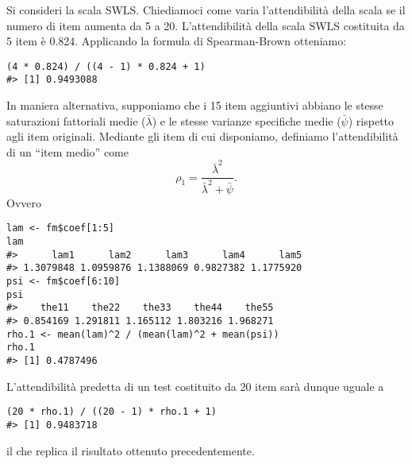 \begin{exmp}
Si consideri la scala SWLS. Chiediamoci come varia l'attendibilità della scala se il numero di item aumenta da 5 a 20. L'attendibilità della scala SWLS costituita da 5 item è 0.824. Applicando la formula di Spearman-Brown otteniamo:

\begin{lstlisting}
(4 * 0.824) / ((4 - 1) * 0.824 + 1)
#> [1] 0.9493088
\end{lstlisting}
\end{exmp}

\begin{exmp}
In maniera alternativa, supponiamo che i 15 item aggiuntivi abbiano le stesse saturazioni fattoriali medie ($\bar{\lambda}$) e le stesse varianze specifiche medie ($\bar{\psi}$) rispetto agli item originali.
Mediante gli item di cui disponiamo, definiamo l'attendibilità di un ``item medio'' come
\begin{equation}
\rho_1 = \frac{\bar{\lambda}^2}{\bar{\lambda}^2 + \bar{\psi}}.
\end{equation}
Ovvero
\begin{lstlisting}
lam <- fm$coef[1:5] 
lam
#>      lam1      lam2      lam3      lam4      lam5 
#> 1.3079848 1.0959876 1.1388069 0.9827382 1.1775920 
psi <- fm$coef[6:10]
psi
#>    the11    the22    the33    the44    the55 
#> 0.854169 1.291811 1.165112 1.803216 1.968271 
rho.1 <- mean(lam)^2 / (mean(lam)^2 + mean(psi)) 
rho.1
#> [1] 0.4787496
\end{lstlisting}
L'attendibilità predetta di un test costituito da 20 item sarà dunque uguale a
\begin{lstlisting}
(20 * rho.1) / ((20 - 1) * rho.1 + 1) 
#> [1] 0.9483718
\end{lstlisting}
il che replica il risultato ottenuto precedentemente.
\end{exmp}

